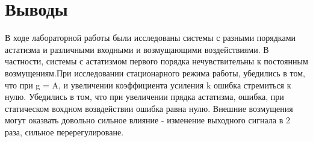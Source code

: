 \documentclass[a4paper, 11pt]{article}
\begin{document}
\section*{Выводы}\hfill\par
В ходе лабораторной работы были исследованы системы с разными порядками астатизма и различными входными и возмущающими воздействиями. В частности, системы с астатизмом первого порядка нечувствительны к постоянным возмущениям.При исследовании стационарного режима работы, убедились в том, что при g = A, и увеличении коэффициента усиления k ошибка стремиться к нулю. 
Убедились в том, что при увеличении прядка астатизма, ошибка, при статическом вохдном возвдействии ошибка равна нулю.
Внешние возмущения могут оказвать довольно сильное влияние - изменение выходного сигнала в 2 раза, сильное перерегулироване.
\end{document}

